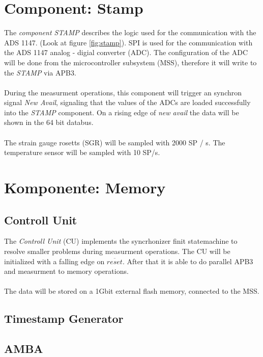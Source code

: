 \section{Component: Stamp}
\label{bes:Stamp}
The \textit{component STAMP} describes the logic used for the communication with the ADS 1147. (Look at figure \ref{fig:stamp}).  
SPI is used for the communication with the ADS 1147 analog - digial converter (ADC). The configuration of the ADC will be done from the microcontroller subsystem (MSS), therefore it will write to the \textit{STAMP} via APB3. \\ \\
During the measurment operations, this component will trigger an synchron signal \textit{New Avail}, signaling that the values of the ADCs are loaded successfully into the \textit{STAMP} component. On a rising edge of \textit{new avail} the data will be shown in the 64 bit databus. \\\\
The strain gauge rosetts (SGR) will be sampled with 2000 SP / s. The temperature sensor will be sampled with 10 SP/s. 
\section{Komponente: Memory}
\label{bes:memory}
\subsection{Controll Unit}
The \textit{Controll Unit} (CU) implements the syncrhonizer finit statemachine to resolve smaller problems during measurment operations. The CU will be initialized with a falling edge on $\overline{reset}$. After that it is able to do parallel APB3 and measurment to memory operations. \\ \\
The data will be stored on a 1Gbit external flash memory, connected to the MSS. 


\subsection{Timestamp Generator}

\subsection{AMBA}
